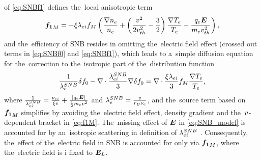 of \eqref{eq:SNBf1} defines the~local anisotropic term
\begin{equation}
  {\boldsymbol{f_1}}_M = -\xi\lambda_{ei}f_M\left( \frac{\nabla n_e}{n_e} 
+ \left( \frac{v^2}{2v_{th}^2} - \frac{3}{2}\right)
\frac{\nabla T_e}{T_e} - \frac{q_e\boldsymbol{E}}{m_ev_{th}^2}\right) ,
  \label{eq:f1M}
\end{equation}
and the~efficiency of SNB resides in omitting the~electric field 
effect (crossed out terms in \eqref{eq:SNBf0} and \eqref{eq:SNBf1}), which
leads to a~simple diffusion equation for the~correction to the~isotropic 
part of the~distribution function
\begin{equation}
  \frac{1}{\lambda_e^{SNB}}\delta f_0 
  - \nabla\cdot\frac{\lambda_{ei}^{SNB}}{3}\nabla\delta f_0 =
  \nabla\cdot\frac{\xi\lambda_{ei}}{3}f_M\frac{\nabla T_e}{T_e}
  ,
  \label{eq:SNB_model}
\end{equation}
where $\frac{1}{\lambda_{ei}^{SNB}} = 
\frac{\nu_{ei}}{\xi v} + \frac{|q_e\boldsymbol{E}|}{\frac{1}{2}m_ev^2}$ 
and $\lambda_e^{SNB} = \frac{v}{r_B \nu_{e}}$, and the~source term based on 
${\boldsymbol{f_1}}_M$ simplifies by avoiding the~electric field effect, density gradient 
and the~$v$-dependent bracket in \eqref{eq:f1M}. The~missing
effect of $\boldsymbol{E}$ in \eqref{eq:SNB_model} is accounted for by 
an~isotropic scattering in definition of $\lambda_{ei}^{SNB}$ \cite{Schurtz_2000}.
Consequently, the~effect of the~electric field in SNB
is accounted for only via ${\boldsymbol{f_1}}_M$, where the~electric field is i
fixed to $\boldsymbol{E}_L$. 


